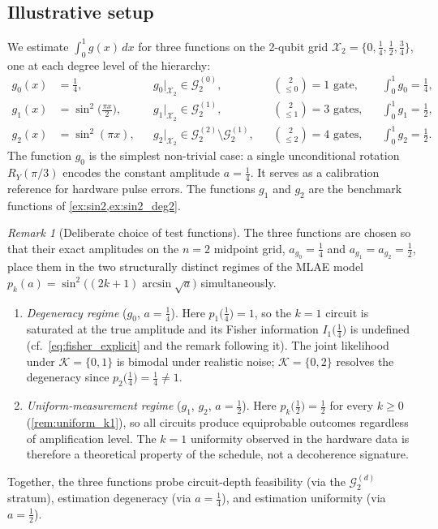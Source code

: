 \documentclass[12pt,a4paper]{article}
\theoremstyle{plain}
\theoremstyle{definition}
\theoremstyle{remark}
\newtheorem{remark}[remark]{Remark}
\newcommand{\Gclass}[2]{\mathcal{G}_{#1}^{(#2)}}
\begin{document}
\subsection{Illustrative setup}
\label{subsec:setup}

We estimate $\int_0^1 g(x)\,dx$ for three functions on the 2-qubit
grid $\mathcal{X}_2 = \{0,\tfrac{1}{4},\tfrac{1}{2},\tfrac{3}{4}\}$,
one at each degree level of the hierarchy:
\begin{align}
  g_0(x) &= \tfrac{1}{4},
    && g_0|_{\mathcal{X}_2}\in\Gclass{2}{0},
    && \binom{2}{\leq 0}=1 \text{ gate},
    && \textstyle\int_0^1 g_0 = \tfrac{1}{4},
    \label{eq:g0_def}\\
  g_1(x) &= \sin^2\!\bigl(\tfrac{\pi x}{2}\bigr),
    && g_1|_{\mathcal{X}_2}\in\Gclass{2}{1},
    && \binom{2}{\leq 1}=3 \text{ gates},
    && \textstyle\int_0^1 g_1 = \tfrac{1}{2},
    \label{eq:g1_def}\\
  g_2(x) &= \sin^2(\pi x),
    && g_2|_{\mathcal{X}_2}\in\Gclass{2}{2}\setminus\Gclass{2}{1},
    && \binom{2}{\leq 2}=4 \text{ gates},
    && \textstyle\int_0^1 g_2 = \tfrac{1}{2}.
    \label{eq:g2_def}
\end{align}
The function $g_0$ is the simplest non-trivial case:
a single unconditional rotation $R_Y(\pi/3)$ encodes the
constant amplitude $a=\tfrac{1}{4}$.
It serves as a calibration reference for hardware pulse errors.
The functions $g_1$ and $g_2$ are the benchmark functions of
\cref{ex:sin2,ex:sin2_deg2}.

\begin{remark}[Deliberate choice of test functions]
\label{rem:test_function_design}
The three functions are chosen so that their exact amplitudes
on the $n=2$ midpoint grid, $a_{g_0}=\tfrac{1}{4}$ and
$a_{g_1}=a_{g_2}=\tfrac{1}{2}$, place them in the two
structurally distinct regimes of the MLAE model
$p_k(a)=\sin^2\!\bigl((2k+1)\arcsin\!\sqrt{a}\bigr)$
simultaneously.
\begin{enumerate}[label=(\roman*)]
\item \emph{Degeneracy regime} ($g_0$, $a=\tfrac{1}{4}$).
Here $p_1\!\bigl(\tfrac{1}{4}\bigr)=1$, so the $k=1$ circuit
is saturated at the true amplitude and its Fisher information
$I_1\!\bigl(\tfrac{1}{4}\bigr)$ is undefined
(cf.\ \eqref{eq:fisher_explicit} and the remark following it).
The joint likelihood under $\mathcal{K}=\{0,1\}$ is bimodal
under realistic noise; $\mathcal{K}=\{0,2\}$ resolves the
degeneracy since $p_2\!\bigl(\tfrac{1}{4}\bigr)=\tfrac{1}{4}\neq1$.
\item \emph{Uniform-measurement regime} ($g_1$, $g_2$, $a=\tfrac{1}{2}$).
Here $p_k\!\bigl(\tfrac{1}{2}\bigr)=\tfrac{1}{2}$ for every
$k\geq 0$ (\cref{rem:uniform_k1}), so all circuits produce
equiprobable outcomes regardless of amplification level.
The $k=1$ uniformity observed in the hardware data is therefore
a theoretical property of the schedule, not a decoherence signature.
\end{enumerate}
Together, the three functions probe circuit-depth feasibility
(via the $\Gclass{2}{d}$ stratum), estimation degeneracy
(via $a=\tfrac{1}{4}$), and estimation uniformity
(via $a=\tfrac{1}{2}$).
\end{remark}
\end{document}
